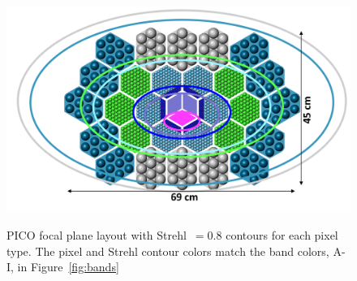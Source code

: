 \documentclass[]{spie}  %
\newcommand{\comb}[1]{\textcolor{blue}{#1}}
\begin{document}


\begin{figure} [ht]
\begin{center}
\includegraphics[height=7.5cm]{version3_focal_plane.png}
\end{center}
\caption { \label{fig:focal_plane} 
PICO focal plane layout with Strehl~$=0.8$ contours for each pixel type. The pixel and Strehl contour colors match the band colors, A-I, 
in Figure~\ref{fig:bands} }
\end{figure} 


\end{document}
